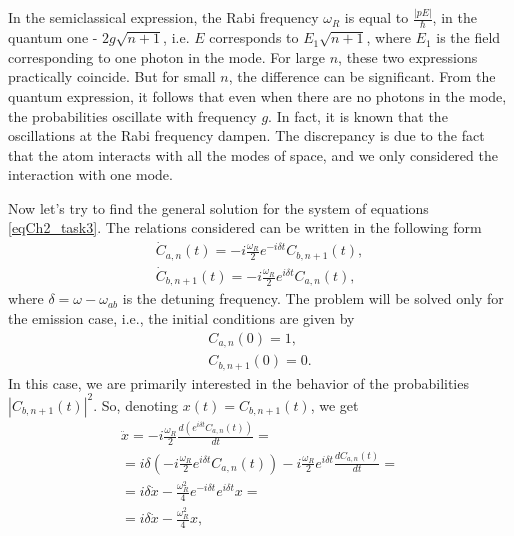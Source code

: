 
In the semiclassical expression, the Rabi frequency $\omega_R$ is equal to 
$\frac{\left|p E\right|}{\hbar}$, in the quantum one - $2g\sqrt{n + 1}$,
i.e. $E$ corresponds to $E_1\sqrt{n + 1}$, where $E_1$ is the field
corresponding to one photon in the mode.  For large $n$, these two
expressions practically coincide. But for small $n$, the difference can be 
significant. From the quantum expression, it follows that even when there are no photons in the mode, the probabilities oscillate with frequency $g$. In fact, it is known that the oscillations at the Rabi frequency dampen. The discrepancy is due to the fact that the atom interacts with all the modes of space, and we only considered the interaction with one mode.  

Now let's try to find the general solution for the system of equations
\eqref{eqCh2_task3}. The relations considered can be written in
the following form
\begin{eqnarray}
  {\dot C}_{a,n}\left(t\right) = -i \frac{\omega_R}{2} e^{-i \delta t} 
C_{b, n + 1}\left(t\right),
\nonumber \\
{\dot C}_{b, n + 1}\left(t\right) = -i \frac{\omega_R}{2} e^{i \delta t} 
C_{a, n}\left(t\right),
  \nonumber
\end{eqnarray}
where $\delta = \omega - \omega_{ab}$ is the detuning frequency.
The problem will be solved only for the emission case, i.e., the initial
conditions are given by
\begin{eqnarray}
  C_{a,n}\left(0\right) = 1,
  \nonumber \\
  C_{b,n+1}\left(0\right) = 0.
  \nonumber
\end{eqnarray}
In this case, we are primarily interested in the behavior of the probabilities
$\left|C_{b, n + 1}\left(t\right)\right|^2$. So,
denoting $x\left(t\right) = C_{b,n+1}\left(t\right)$, we get
\begin{eqnarray}
  \ddot{x} =  -i \frac{\omega_R}{2} \frac{d \left(e^{i \delta t} 
    C_{a, n}\left(t\right)\right) }{d t} =
  \nonumber \\
  = i \delta \left(- i \frac{\omega_R}{2} e^{i\delta t} 
  C_{a, n}\left(t\right) \right) -i \frac{\omega_R}{2} e^{i \delta t}
  \frac{d C_{a, n}\left(t\right)}{dt} =
  \nonumber \\
  = i \delta \dot{x} - \frac{\omega_R^2}{4} e^{-i \delta t} e^{i \delta t} x =
  \nonumber \\
  = i \delta \dot{x} - \frac{\omega_R^2}{4} x,
  \nonumber
\end{eqnarray}
